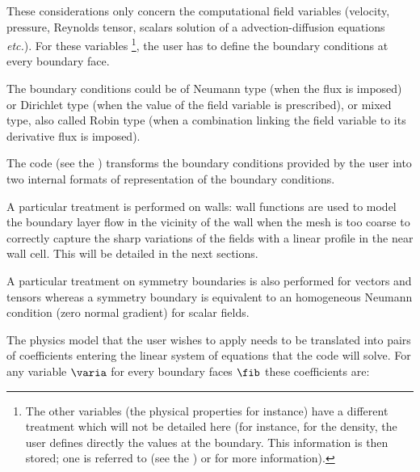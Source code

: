 These considerations only concern the computational field variables
(velocity, pressure, Reynolds tensor,
scalars solution of a advection-diffusion equations \emph{etc.}). For these variables
\footnote{
The other variables
(the physical properties for instance) have a different treatment which will
not be detailed here (for instance, for the density, the user defines
directly the values at the boundary. This information is then stored; one
is referred to  (see the )
 or  for more information).
},
the user has to define the boundary conditions at every boundary face.

The boundary conditions could be of Neumann type (when the flux is imposed)
or Dirichlet type (when the value of the field variable is prescribed), or mixed type, also
called Robin type (when a combination linking the field variable to its derivative flux
is imposed).

The code (see the )
 transforms the boundary conditions provided by the user
 into two internal formats of representation of the boundary
 conditions.

 A particular treatment is performed on walls:
 wall functions are used to model the boundary layer flow in the vicinity of the wall when the mesh is too coarse to correctly capture the sharp variations of the fields with a linear profile in the near wall cell.
 This will be detailed in the next sections.

A particular treatment on symmetry boundaries is also performed for vectors and tensors
whereas a symmetry boundary is equivalent to an homogeneous Neumann condition (zero normal gradient) for scalar fields.

The physics model that the user wishes to apply needs to be translated into pairs of coefficients
entering the linear system of equations that the code will solve. For any variable $\varia$ for every boundary faces $\fib$ these coefficients are:


